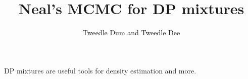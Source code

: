\documentclass[11pt]{amsart}
\title{Neal's MCMC for DP mixtures}
\author{Tweedle Dum and Tweedle Dee}
\begin{document}
\maketitle

DP mixtures are useful tools for density estimation and more.
\end{document}
